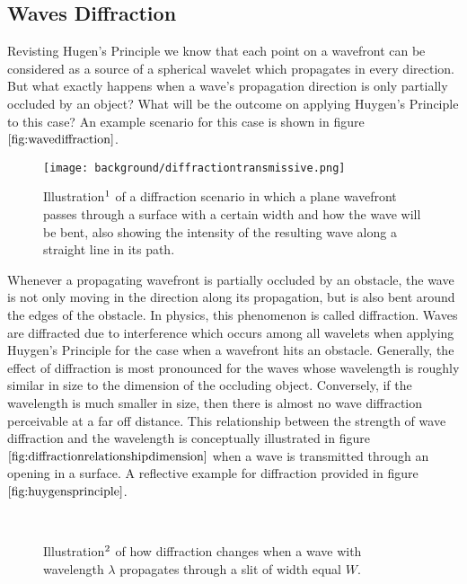 \subsection{Waves Diffraction}
Revisting Hugen's Principle we know that each point on a wavefront can be considered as a source of a spherical wavelet which propagates in every direction. But what exactly happens when a wave's propagation direction is only partially occluded by an object? What will be the outcome on applying Huygen's Principle to this case? An example scenario for this case is shown in figure $\ref{fig:wavediffraction}$. 

\begin{figure}[H]
  \centering
  \texttt{[image: background/diffractiontransmissive.png]}
  \caption[Diffracted Wave]{Illustration$\footnotemark$ of a diffraction scenario in which a plane wavefront passes through a surface with a certain width and how the wave will be bent, also showing the intensity of the resulting wave along a straight line in its path.}
  \label{fig:wavediffraction}
\end{figure}

Whenever a propagating wavefront is partially occluded by an obstacle, the wave is not only moving in the direction along its propagation, but is also bent around the edges of the obstacle. In physics, this phenomenon is called diffraction. Waves are diffracted due to interference which occurs among all wavelets when applying Huygen's Principle for the case when a wavefront hits an obstacle. Generally, the effect of diffraction is most pronounced for the waves whose wavelength is roughly similar in size to the dimension of the occluding object. Conversely, if the wavelength is much smaller in size, then there is almost no wave diffraction perceivable at a far off distance. This relationship between the strength of wave diffraction and the wavelength is conceptually illustrated in figure $\ref{fig:diffractionrelationshipdimension}$ when a wave is transmitted through an opening in a surface. A reflective example for diffraction provided in figure $\ref{fig:huygensprinciple}$.

\begin{figure}[H]
  \centering
~
~
  \caption[Diffraction for different $\texttt{Wavelength/Slit-Width}$ ratio]{Illustration$\footnotemark$ of how diffraction changes when a wave with wavelength $\lambda$ propagates through a slit of width equal $W$.}
  \label{fig:diffractionrelationshipdimension}
\end{figure}

